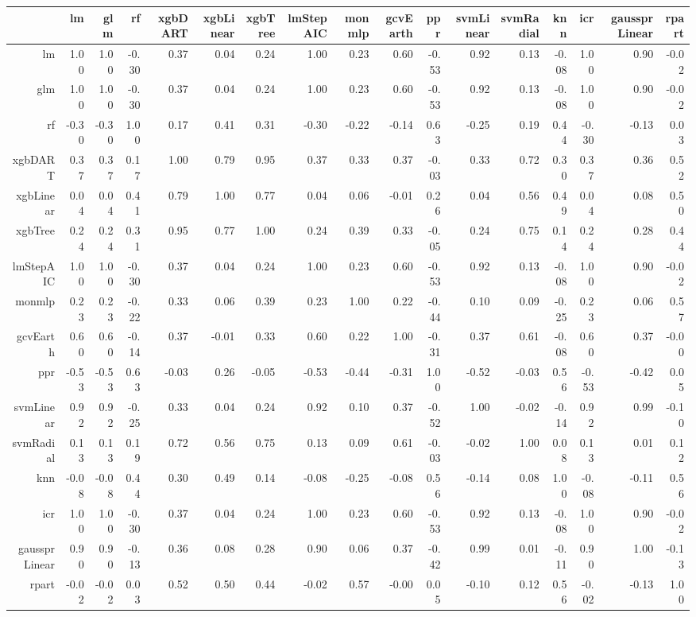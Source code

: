 \begin{table}[ht]
\centering
\begin{tabular}{rrrrrrrrrrrrrrrrr}
  \hline
 & lm & glm & rf & xgbDART & xgbLinear & xgbTree & lmStepAIC & monmlp & gcvEarth & ppr & svmLinear & svmRadial & knn & icr & gaussprLinear & rpart \\ 
  \hline
lm & 1.00 & 1.00 & -0.30 & 0.37 & 0.04 & 0.24 & 1.00 & 0.23 & 0.60 & -0.53 & 0.92 & 0.13 & -0.08 & 1.00 & 0.90 & -0.02 \\ 
  glm & 1.00 & 1.00 & -0.30 & 0.37 & 0.04 & 0.24 & 1.00 & 0.23 & 0.60 & -0.53 & 0.92 & 0.13 & -0.08 & 1.00 & 0.90 & -0.02 \\ 
  rf & -0.30 & -0.30 & 1.00 & 0.17 & 0.41 & 0.31 & -0.30 & -0.22 & -0.14 & 0.63 & -0.25 & 0.19 & 0.44 & -0.30 & -0.13 & 0.03 \\ 
  xgbDART & 0.37 & 0.37 & 0.17 & 1.00 & 0.79 & 0.95 & 0.37 & 0.33 & 0.37 & -0.03 & 0.33 & 0.72 & 0.30 & 0.37 & 0.36 & 0.52 \\ 
  xgbLinear & 0.04 & 0.04 & 0.41 & 0.79 & 1.00 & 0.77 & 0.04 & 0.06 & -0.01 & 0.26 & 0.04 & 0.56 & 0.49 & 0.04 & 0.08 & 0.50 \\ 
  xgbTree & 0.24 & 0.24 & 0.31 & 0.95 & 0.77 & 1.00 & 0.24 & 0.39 & 0.33 & -0.05 & 0.24 & 0.75 & 0.14 & 0.24 & 0.28 & 0.44 \\ 
  lmStepAIC & 1.00 & 1.00 & -0.30 & 0.37 & 0.04 & 0.24 & 1.00 & 0.23 & 0.60 & -0.53 & 0.92 & 0.13 & -0.08 & 1.00 & 0.90 & -0.02 \\ 
  monmlp & 0.23 & 0.23 & -0.22 & 0.33 & 0.06 & 0.39 & 0.23 & 1.00 & 0.22 & -0.44 & 0.10 & 0.09 & -0.25 & 0.23 & 0.06 & 0.57 \\ 
  gcvEarth & 0.60 & 0.60 & -0.14 & 0.37 & -0.01 & 0.33 & 0.60 & 0.22 & 1.00 & -0.31 & 0.37 & 0.61 & -0.08 & 0.60 & 0.37 & -0.00 \\ 
  ppr & -0.53 & -0.53 & 0.63 & -0.03 & 0.26 & -0.05 & -0.53 & -0.44 & -0.31 & 1.00 & -0.52 & -0.03 & 0.56 & -0.53 & -0.42 & 0.05 \\ 
  svmLinear & 0.92 & 0.92 & -0.25 & 0.33 & 0.04 & 0.24 & 0.92 & 0.10 & 0.37 & -0.52 & 1.00 & -0.02 & -0.14 & 0.92 & 0.99 & -0.10 \\ 
  svmRadial & 0.13 & 0.13 & 0.19 & 0.72 & 0.56 & 0.75 & 0.13 & 0.09 & 0.61 & -0.03 & -0.02 & 1.00 & 0.08 & 0.13 & 0.01 & 0.12 \\ 
  knn & -0.08 & -0.08 & 0.44 & 0.30 & 0.49 & 0.14 & -0.08 & -0.25 & -0.08 & 0.56 & -0.14 & 0.08 & 1.00 & -0.08 & -0.11 & 0.56 \\ 
  icr & 1.00 & 1.00 & -0.30 & 0.37 & 0.04 & 0.24 & 1.00 & 0.23 & 0.60 & -0.53 & 0.92 & 0.13 & -0.08 & 1.00 & 0.90 & -0.02 \\ 
  gaussprLinear & 0.90 & 0.90 & -0.13 & 0.36 & 0.08 & 0.28 & 0.90 & 0.06 & 0.37 & -0.42 & 0.99 & 0.01 & -0.11 & 0.90 & 1.00 & -0.13 \\ 
  rpart & -0.02 & -0.02 & 0.03 & 0.52 & 0.50 & 0.44 & -0.02 & 0.57 & -0.00 & 0.05 & -0.10 & 0.12 & 0.56 & -0.02 & -0.13 & 1.00 \\ 
   \hline
\end{tabular}
\end{table}
